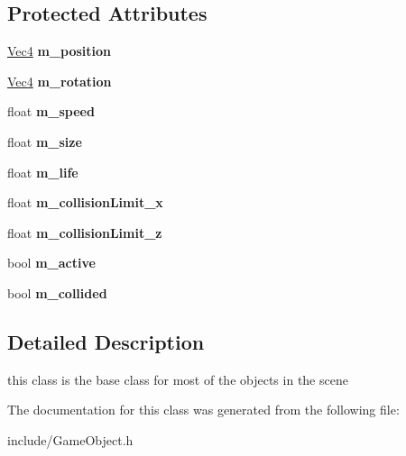 \subsection*{Protected Attributes}
\begin{DoxyCompactItemize}
\item 
\hyperlink{classVec4}{Vec4} {\bfseries m\+\_\+position}\hypertarget{classGameObject_a3173b6cca3aa6b1d3d6989fd4bfb7b40}{}\label{classGameObject_a3173b6cca3aa6b1d3d6989fd4bfb7b40}

\item 
\hyperlink{classVec4}{Vec4} {\bfseries m\+\_\+rotation}\hypertarget{classGameObject_a1af7cd3ccd584b494b84cb8d1128abaf}{}\label{classGameObject_a1af7cd3ccd584b494b84cb8d1128abaf}

\item 
float {\bfseries m\+\_\+speed}\hypertarget{classGameObject_a1e3d1c84dbf06473b5f058ec032b859a}{}\label{classGameObject_a1e3d1c84dbf06473b5f058ec032b859a}

\item 
float {\bfseries m\+\_\+size}\hypertarget{classGameObject_a707df0ee16fc77ceed35015b1d739de2}{}\label{classGameObject_a707df0ee16fc77ceed35015b1d739de2}

\item 
float {\bfseries m\+\_\+life}\hypertarget{classGameObject_acc140236510083ff31d931dba9f90ba3}{}\label{classGameObject_acc140236510083ff31d931dba9f90ba3}

\item 
float {\bfseries m\+\_\+collision\+Limit\+\_\+x}\hypertarget{classGameObject_a988655066d614a89f3614f823fb38d2b}{}\label{classGameObject_a988655066d614a89f3614f823fb38d2b}

\item 
float {\bfseries m\+\_\+collision\+Limit\+\_\+z}\hypertarget{classGameObject_a801cd4461df690e0ef4a4311ca7ec26d}{}\label{classGameObject_a801cd4461df690e0ef4a4311ca7ec26d}

\item 
bool {\bfseries m\+\_\+active}\hypertarget{classGameObject_a65307073834455243a8b339592245603}{}\label{classGameObject_a65307073834455243a8b339592245603}

\item 
bool {\bfseries m\+\_\+collided}\hypertarget{classGameObject_a5fac043e6844df16e5ccaf5ffaaab5bd}{}\label{classGameObject_a5fac043e6844df16e5ccaf5ffaaab5bd}

\end{DoxyCompactItemize}


\subsection{Detailed Description}
this class is the base class for most of the objects in the scene 

The documentation for this class was generated from the following file\+:\begin{DoxyCompactItemize}
\item 
include/Game\+Object.\+h\end{DoxyCompactItemize}
